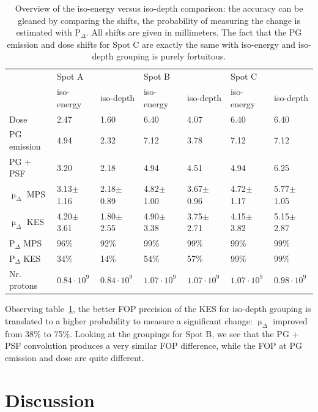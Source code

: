 \documentclass[a4paper,english]{article}
\begin{document}
\begin{table}
\centering
\begin{tabular}{lllllll}
	 & Spot A & & Spot B & & Spot C\\
	 & iso-energy & iso-depth & iso-energy & iso-depth & iso-energy & iso-depth \\
	\midrule
	Dose & 2.47 & 1.60 & 6.40 & 4.07 & 6.40 & 6.40 \\
	PG emission & 4.94 & 2.32 & 7.12 & 3.78 & 7.12 & 7.12 \\
	PG + PSF & 3.20 & 2.18 & 4.94 & 4.51 & 4.94 & 6.25 \\
	$\upmu_\Delta$ MPS & 3.13$\pm$1.16 & 2.18$\pm$0.89 & 4.82$\pm$1.00 & 3.67$\pm$0.96 & 4.72$\pm$1.17 & 5.77$\pm$1.05  \\
	$\upmu_\Delta$ KES & 4.20$\pm$3.61 & 1.80$\pm$2.55 & 4.90$\pm$3.38 & 3.75$\pm$2.71 & 4.15$\pm$3.82 & 5.15$\pm$2.87  \\
	\midrule
	P$_\Delta$ MPS & 96\% & 92\%  & 99\% & 99\%  & 99\% & 99\% \\
	P$_\Delta$ KES & 34\% & 14\%  & 54\% & 57\%  & 99\% & 99\%  \\
	\midrule
	Nr. protons & $0.84\cdot10^9$ & $0.84\cdot10^9$ & $1.07\cdot10^9$ & $1.07\cdot10^9$ & $1.07\cdot10^9$ & $0.98\cdot10^9$ \\
\end{tabular}
\caption{Overview of the iso-energy versus iso-depth comparison: the accuracy can be gleaned by comparing the shifts, the probability of measuring the change is estimated with P$_\Delta$. All shifts are given in millimeters. The fact that the PG emission and dose shifts for Spot C are exactly the same with iso-energy and iso-depth grouping is purely fortuitous.}
\label{table:layerresults}
\end{table}

Observing table~\ref{table:layerresults}, the better FOP precision of the KES for iso-depth grouping is translated to a higher probability to measure a significant change: $\upmu_\Delta$ improved from 38\% to 75\%. Looking at the groupings for Spot B, we see that the PG + PSF convolution produces a very similar FOP difference, while the FOP at PG emission and dose are quite different.

\section{Discussion}
\end{document}
